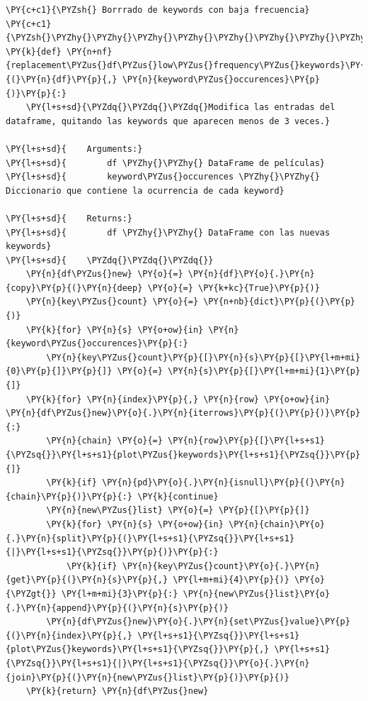     \begin{tcolorbox}[breakable, size=fbox, boxrule=1pt, pad at break*=1mm,colback=cellbackground, colframe=cellborder]
\begin{Verbatim}[commandchars=\\\{\}]
\PY{c+c1}{\PYZsh{} Borrrado de keywords con baja frecuencia}
\PY{c+c1}{\PYZsh{}\PYZhy{}\PYZhy{}\PYZhy{}\PYZhy{}\PYZhy{}\PYZhy{}\PYZhy{}\PYZhy{}\PYZhy{}\PYZhy{}\PYZhy{}\PYZhy{}\PYZhy{}\PYZhy{}\PYZhy{}\PYZhy{}\PYZhy{}\PYZhy{}\PYZhy{}\PYZhy{}\PYZhy{}\PYZhy{}\PYZhy{}\PYZhy{}\PYZhy{}\PYZhy{}\PYZhy{}\PYZhy{}\PYZhy{}\PYZhy{}\PYZhy{}\PYZhy{}\PYZhy{}\PYZhy{}\PYZhy{}\PYZhy{}\PYZhy{}\PYZhy{}\PYZhy{}\PYZhy{}\PYZhy{}\PYZhy{}\PYZhy{}}
\PY{k}{def} \PY{n+nf}{replacement\PYZus{}df\PYZus{}low\PYZus{}frequency\PYZus{}keywords}\PY{p}{(}\PY{n}{df}\PY{p}{,} \PY{n}{keyword\PYZus{}occurences}\PY{p}{)}\PY{p}{:}
    \PY{l+s+sd}{\PYZdq{}\PYZdq{}\PYZdq{}Modifica las entradas del dataframe, quitando las keywords que aparecen menos de 3 veces.}

\PY{l+s+sd}{    Arguments:}
\PY{l+s+sd}{        df \PYZhy{}\PYZhy{} DataFrame de películas}
\PY{l+s+sd}{        keyword\PYZus{}occurences \PYZhy{}\PYZhy{} Diccionario que contiene la ocurrencia de cada keyword}

\PY{l+s+sd}{    Returns:}
\PY{l+s+sd}{        df \PYZhy{}\PYZhy{} DataFrame con las nuevas keywords}
\PY{l+s+sd}{    \PYZdq{}\PYZdq{}\PYZdq{}}
    \PY{n}{df\PYZus{}new} \PY{o}{=} \PY{n}{df}\PY{o}{.}\PY{n}{copy}\PY{p}{(}\PY{n}{deep} \PY{o}{=} \PY{k+kc}{True}\PY{p}{)}
    \PY{n}{key\PYZus{}count} \PY{o}{=} \PY{n+nb}{dict}\PY{p}{(}\PY{p}{)}
    \PY{k}{for} \PY{n}{s} \PY{o+ow}{in} \PY{n}{keyword\PYZus{}occurences}\PY{p}{:} 
        \PY{n}{key\PYZus{}count}\PY{p}{[}\PY{n}{s}\PY{p}{[}\PY{l+m+mi}{0}\PY{p}{]}\PY{p}{]} \PY{o}{=} \PY{n}{s}\PY{p}{[}\PY{l+m+mi}{1}\PY{p}{]}    
    \PY{k}{for} \PY{n}{index}\PY{p}{,} \PY{n}{row} \PY{o+ow}{in} \PY{n}{df\PYZus{}new}\PY{o}{.}\PY{n}{iterrows}\PY{p}{(}\PY{p}{)}\PY{p}{:}
        \PY{n}{chain} \PY{o}{=} \PY{n}{row}\PY{p}{[}\PY{l+s+s1}{\PYZsq{}}\PY{l+s+s1}{plot\PYZus{}keywords}\PY{l+s+s1}{\PYZsq{}}\PY{p}{]}
        \PY{k}{if} \PY{n}{pd}\PY{o}{.}\PY{n}{isnull}\PY{p}{(}\PY{n}{chain}\PY{p}{)}\PY{p}{:} \PY{k}{continue}
        \PY{n}{new\PYZus{}list} \PY{o}{=} \PY{p}{[}\PY{p}{]}
        \PY{k}{for} \PY{n}{s} \PY{o+ow}{in} \PY{n}{chain}\PY{o}{.}\PY{n}{split}\PY{p}{(}\PY{l+s+s1}{\PYZsq{}}\PY{l+s+s1}{|}\PY{l+s+s1}{\PYZsq{}}\PY{p}{)}\PY{p}{:} 
            \PY{k}{if} \PY{n}{key\PYZus{}count}\PY{o}{.}\PY{n}{get}\PY{p}{(}\PY{n}{s}\PY{p}{,} \PY{l+m+mi}{4}\PY{p}{)} \PY{o}{\PYZgt{}} \PY{l+m+mi}{3}\PY{p}{:} \PY{n}{new\PYZus{}list}\PY{o}{.}\PY{n}{append}\PY{p}{(}\PY{n}{s}\PY{p}{)}
        \PY{n}{df\PYZus{}new}\PY{o}{.}\PY{n}{set\PYZus{}value}\PY{p}{(}\PY{n}{index}\PY{p}{,} \PY{l+s+s1}{\PYZsq{}}\PY{l+s+s1}{plot\PYZus{}keywords}\PY{l+s+s1}{\PYZsq{}}\PY{p}{,} \PY{l+s+s1}{\PYZsq{}}\PY{l+s+s1}{|}\PY{l+s+s1}{\PYZsq{}}\PY{o}{.}\PY{n}{join}\PY{p}{(}\PY{n}{new\PYZus{}list}\PY{p}{)}\PY{p}{)}
    \PY{k}{return} \PY{n}{df\PYZus{}new}  
\end{Verbatim}
\end{tcolorbox}

